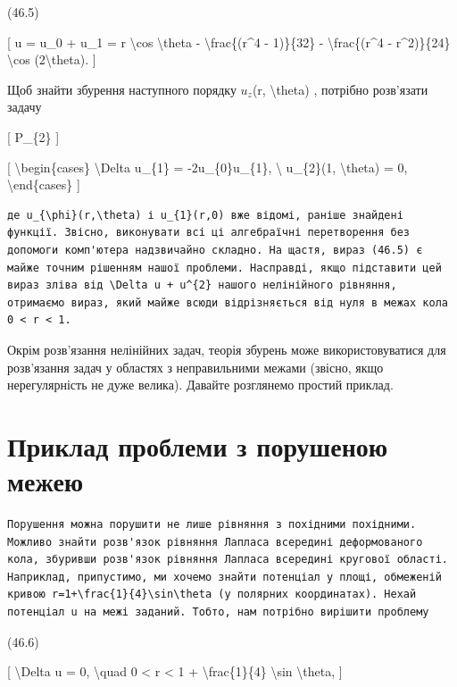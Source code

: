 \documentclass[
]{article}
\begin{document}
{(46.5)

{[} u = u\_0 + u\_1 = r \textbackslash cos \textbackslash theta -
\textbackslash frac\{(r\^{}4 - 1)\}\{32\} - \textbackslash frac\{(r\^{}4
- r\^{}2)\}\{24\} \textbackslash cos (2\textbackslash theta). {]}

Щоб знайти збурення наступного порядку \(u_{z}\)(r,
\textbackslash theta) , потрібно розв'язати задачу

{[} P\_\{2\} {]}

{[} \textbackslash begin\{cases\} \textbackslash Delta u\_\{1\} =
-2u\_\{0\}u\_\{1\}, \textbackslash{} u\_\{2\}(1, \textbackslash theta) =
0, \textbackslash end\{cases\} {]}

\begin{verbatim}
де u_{\phi}(r,\theta) і u_{1}(r,0) вже відомі, раніше знайдені функції. Звісно, виконувати всі ці алгебраїчні перетворення без допомоги комп'ютера надзвичайно складно. На щастя, вираз (46.5) є майже точним рішенням нашої проблеми. Насправді, якщо підставити цей вираз зліва від \Delta u + u^{2} нашого нелінійного рівняння, отримаємо вираз, який майже всюди відрізняється від нуля в межах кола 0 < r < 1.
\end{verbatim}

Окрім розв'язання нелінійних задач, теорія збурень може
використовуватися для розв'язання задач у областях з неправильними
межами (звісно, якщо нерегулярність не дуже велика). Давайте розглянемо
простий приклад.

\section{Приклад проблеми з порушеною
межею}\label{ux43fux440ux438ux43aux43bux430ux434-ux43fux440ux43eux431ux43bux435ux43cux438-ux437-ux43fux43eux440ux443ux448ux435ux43dux43eux44e-ux43cux435ux436ux435ux44e}

\begin{verbatim}
Порушення можна порушити не лише рівняння з похідними похідними. Можливо знайти розв'язок рівняння Лапласа всередині деформованого кола, збуривши розв'язок рівняння Лапласа всередині кругової області. Наприклад, припустимо, ми хочемо знайти потенціал у площі, обмеженій кривою r=1+\frac{1}{4}\sin\theta (у полярних координатах). Нехай потенціал u на межі заданий. Тобто, нам потрібно вирішити проблему
\end{verbatim}

(46.6)

{[} \textbackslash Delta u = 0, \textbackslash quad 0 \textless{} r
\textless{} 1 + \textbackslash frac\{1\}\{4\} \textbackslash sin
\textbackslash theta, {]}

}
\end{document}
